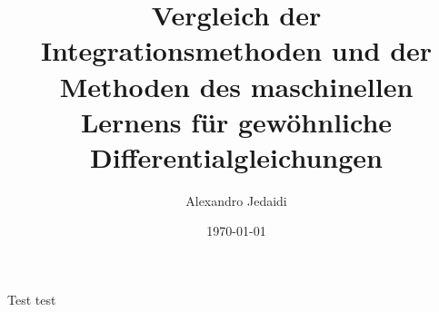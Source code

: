 \documentclass[
    paper=a4, %
    fontsize=10pt,  %
    oneside,        %
    headsepline,    %
    notitlepage     %
]{beamer}         %
\author{Alexandro Jedaidi}
\title{\textbf{Vergleich der Integrationsmethoden und der Methoden des maschinellen
Lernens für gewöhnliche Differentialgleichungen}}
\date{\today}
\begin{document}
    \begin{frame}
        \maketitle
    \end{frame}

    \begin{frame}
        \tableofcontents
    \end{frame}

    \begin{frame}{Test}
        test
    \end{frame}

    \begin{frame}
        \printbibliography[heading=bibintoc]
    \end{frame}

    \begin{frame}
        \listoffigures
    \end{frame}
\end{document}
